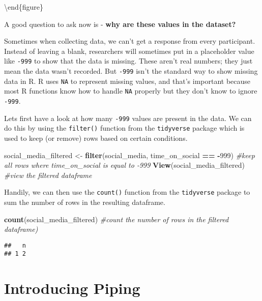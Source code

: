 \documentclass[
]{book}
\newenvironment{Shaded}{\begin{snugshade}}{\end{snugshade}}
\newcommand{\CommentTok}[1]{\textcolor[rgb]{0.56,0.35,0.01}{\textit{#1}}}
\newcommand{\DecValTok}[1]{\textcolor[rgb]{0.00,0.00,0.81}{#1}}
\newcommand{\FunctionTok}[1]{\textcolor[rgb]{0.13,0.29,0.53}{\textbf{#1}}}
\newcommand{\NormalTok}[1]{#1}
\newcommand{\OtherTok}[1]{\textcolor[rgb]{0.56,0.35,0.01}{#1}}
\newcommand{\SpecialCharTok}[1]{\textcolor[rgb]{0.81,0.36,0.00}{\textbf{#1}}}
\begin{document}
\label{fig:unnamed-chunk-22}
\textbackslash end\{figure\}

A good question to ask now is - \textbf{why are these values in the dataset?}

Sometimes when collecting data, we can't get a response from every participant. Instead of leaving a blank, researchers will sometimes put in a placeholder value like \texttt{-999} to show that the data is missing. These aren't real numbers; they just mean the data wasn't recorded. But \texttt{-999} isn't the standard way to show missing data in R. R uses \texttt{NA} to represent missing values, and that's important because most R functions know how to handle \texttt{NA} properly but they don't know to ignore \texttt{-999}.

Lets first have a look at how many \texttt{-999} values are present in the data. We can do this by using the \texttt{filter()} function from the \texttt{tidyverse} package which is used to keep (or remove) rows based on certain conditions.

\begin{Shaded}
\begin{Highlighting}[]
\NormalTok{social\_media\_filtered }\OtherTok{\textless{}{-}} \FunctionTok{filter}\NormalTok{(social\_media, time\_on\_social }\SpecialCharTok{==} \SpecialCharTok{{-}}\DecValTok{999}\NormalTok{) }\CommentTok{\#keep all rows where \textasciigrave{}time\_on\_social\textasciigrave{} is equal to {-}999}
\FunctionTok{View}\NormalTok{(social\_media\_filtered) }\CommentTok{\#view the filtered dataframe}
\end{Highlighting}
\end{Shaded}

Handily, we can then use the \texttt{count()} function from the \texttt{tidyverse} package to sum the number of rows in the resulting dataframe.

\begin{Shaded}
\begin{Highlighting}[]
\FunctionTok{count}\NormalTok{(social\_media\_filtered) }\CommentTok{\#count the number of rows in the filtered dataframe)}
\end{Highlighting}
\end{Shaded}

\begin{verbatim}
##   n
## 1 2
\end{verbatim}

\section{Introducing Piping}\label{introducing-piping}
\end{document}
